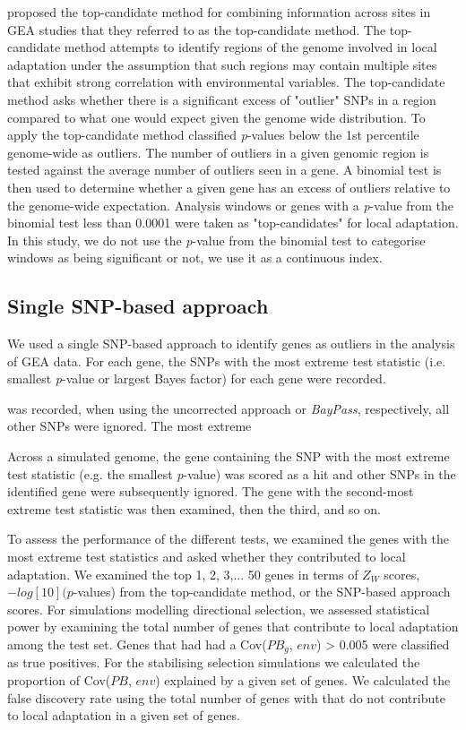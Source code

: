 \documentclass[10pt,twoside,lineno, twocolumn]{GSA_format}
\begin{document}
\cite{Yeaman2016} proposed the top-candidate method for combining information across sites in GEA studies that they referred to as the top-candidate method. The top-candidate method attempts to identify regions of the genome involved in local adaptation under the assumption that such regions may contain multiple sites that exhibit strong correlation with environmental variables. The top-candidate method asks whether there is a significant excess of "outlier" SNPs in a region compared to what one would expect given the genome wide distribution. To apply the top-candidate method \cite{Yeaman2016} classified \textit{p}-values below the 1st percentile genome-wide as outliers. The number of outliers in a given genomic region is tested against the average number of outliers seen in a gene. A binomial test is then used to determine whether a given gene has an excess of outliers relative to the genome-wide expectation. Analysis windows or genes with a \textit{p}-value from the binomial test less than 0.0001 were taken as "top-candidates" for local adaptation. In this study, we do not use the \textit{p}-value from the binomial test to categorise windows as being significant or not, we use it as a continuous index.


\subsection{Single SNP-based approach} 

We used a single SNP-based approach to identify genes as outliers in the analysis of GEA data. For each gene, the SNPs with the most extreme test statistic (i.e. smallest \textit{p}-value or largest Bayes factor) for each gene were recorded. 

 was recorded, when using the uncorrected approach or \textit{BayPass}, respectively, all other SNPs were ignored. The most extreme 

Across a simulated genome, the gene containing the SNP with the most extreme test statistic (e.g. the smallest \textit{p}-value) was scored as a hit and other SNPs in the identified gene were subsequently ignored. The gene with the second-most extreme test statistic was then examined, then the third, and so on. 


To assess the performance of the different tests, we examined the genes with the most extreme test statistics and asked whether they contributed to local adaptation. We examined the top 1, 2, 3,... 50 genes in terms of $Z_W$ scores, $-log[10](p$-values) from the top-candidate method, or the SNP-based approach scores. For simulations modelling directional selection, we assessed statistical power by examining the total number of genes that contribute to local adaptation among the test set. Genes that had had a Cov($PB_g$, $env$) > 0.005 were classified as true positives. For the stabilising selection simulations we calculated the proportion of Cov($PB$, $env$) explained by a given set of genes. We calculated the false discovery rate using the total number of genes with that do not contribute to local adaptation in a given set of genes. \\
\end{document}
